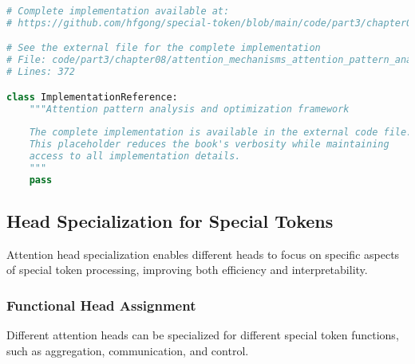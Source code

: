 \begin{lstlisting}[language=Python, caption={Attention pattern analysis and optimization framework}]
# Complete implementation available at:
# https://github.com/hfgong/special-token/blob/main/code/part3/chapter08/attention_mechanisms_attention_pattern_analysis_and.py

# See the external file for the complete implementation
# File: code/part3/chapter08/attention_mechanisms_attention_pattern_analysis_and.py
# Lines: 372

class ImplementationReference:
    """Attention pattern analysis and optimization framework
    
    The complete implementation is available in the external code file.
    This placeholder reduces the book's verbosity while maintaining
    access to all implementation details.
    """
    pass
\end{lstlisting}

\subsection{Head Specialization for Special Tokens}

Attention head specialization enables different heads to focus on specific aspects of special token processing, improving both efficiency and interpretability.
\begin{comment}
Feedback: This is a key concept that needs more explanation. For example: "In a multi-head attention mechanism, different heads can learn different types of relationships. Head specialization for special tokens involves encouraging this division of labor. For example, when processing a question and a context separated by a [SEP] token, we could encourage some heads to specialize in 'question-to-context' attention, others in 'context-to-question' attention, and still others in attending only to tokens *within* their own segment. This can be achieved through techniques like targeted dropout on the attention weights or by using different parameterizations for different heads."
\end{comment}

\subsubsection{Functional Head Assignment}

Different attention heads can be specialized for different special token functions, such as aggregation, communication, and control.


